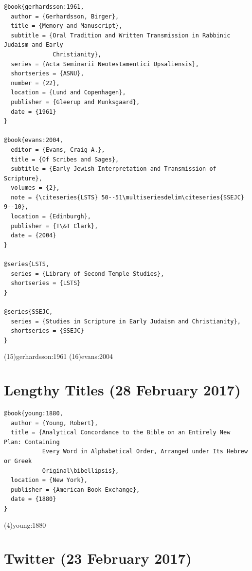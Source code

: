 \documentclass[a4paper]{article}
\begin{document}
\begin{verbatim}
@book{gerhardsson:1961,
  author = {Gerhardsson, Birger},
  title = {Memory and Manuscript},
  subtitle = {Oral Tradition and Written Transmission in Rabbinic Judaism and Early
              Christianity},
  series = {Acta Seminarii Neotestamentici Upsaliensis},
  shortseries = {ASNU},
  number = {22},
  location = {Lund and Copenhagen},
  publisher = {Gleerup and Munksgaard},
  date = {1961}
}

@book{evans:2004,
  editor = {Evans, Craig A.},
  title = {Of Scribes and Sages},
  subtitle = {Early Jewish Interpretation and Transmission of Scripture},
  volumes = {2},
  note = {\citeseries{LSTS} 50--51\multiseriesdelim\citeseries{SSEJC} 9--10},
  location = {Edinburgh},
  publisher = {T\&T Clark},
  date = {2004}
}

@series{LSTS,
  series = {Library of Second Temple Studies},
  shortseries = {LSTS}
}

@series{SSEJC,
  series = {Studies in Scripture in Early Judaism and Christianity},
  shortseries = {SSEJC}
}
\end{verbatim}

\examplecite(15){gerhardsson:1961}
\examplecite(16){evans:2004}
\nocite{LSTS, SSEJC}
\exampleabbreviations
\examplebibliography
{}

\section{Lengthy Titles (28 February 2017)}

\begin{verbatim}
@book{young:1880,
  author = {Young, Robert},
  title = {Analytical Concordance to the Bible on an Entirely New Plan: Containing
           Every Word in Alphabetical Order, Arranged under Its Hebrew or Greek
           Original\bibellipsis},
  location = {New York},
  publisher = {American Book Exchange},
  date = {1880}
}
\end{verbatim}

\examplecite(4){young:1880}
\examplebibliography
{}

\section{Twitter (23 February 2017)}
\end{document}
